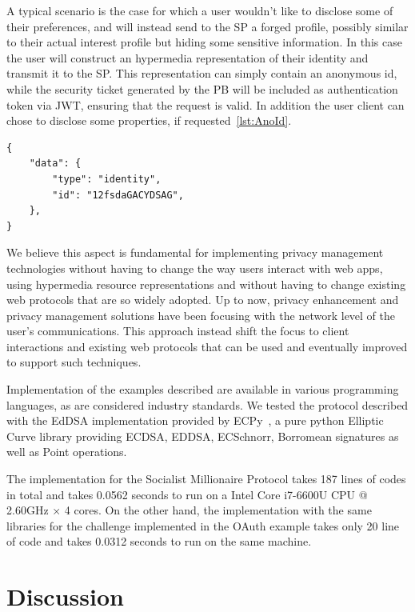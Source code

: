 A typical scenario is the case for which a user wouldn't like to disclose some of their preferences, and will instead send to the SP a forged profile, possibly similar to their actual interest profile but hiding some sensitive information. In this case the user will construct an hypermedia representation of their identity and transmit  it to the SP. This representation can simply contain an anonymous id, while the security ticket generated by the PB will be included as authentication token via JWT, ensuring that the request is valid. In addition the user client can chose to disclose some properties, if requested~\ref{lst:AnoId}.

\begin{lstlisting}
{
    "data": {
        "type": "identity",
        "id": "12fsdaGACYDSAG",
    },
}
\end{lstlisting}

We believe this aspect is fundamental for implementing privacy management technologies without having to change the way users interact with web apps, using hypermedia resource representations and without having to change existing web protocols that are so widely adopted. Up to now, privacy enhancement and privacy management solutions have been focusing with the network level of the user's communications. This approach instead shift the focus to client interactions and existing web protocols that can be used and eventually improved to support such techniques.

Implementation of the examples described are available in various programming languages, as are considered industry standards. We tested the protocol described with the EdDSA implementation provided by ECPy~\cite{ecpy}, a pure python Elliptic Curve library providing ECDSA, EDDSA, ECSchnorr, Borromean signatures as well as Point operations.

The implementation for the Socialist Millionaire Protocol takes 187 lines of codes in total and takes 0.0562 seconds to run on a Intel Core i7-6600U CPU @ 2.60GHz × 4 cores. On the other hand, the implementation with the same libraries for the challenge implemented in the OAuth example takes only 20 line of code and takes 0.0312 seconds to run on the same machine.



\section{Discussion}

